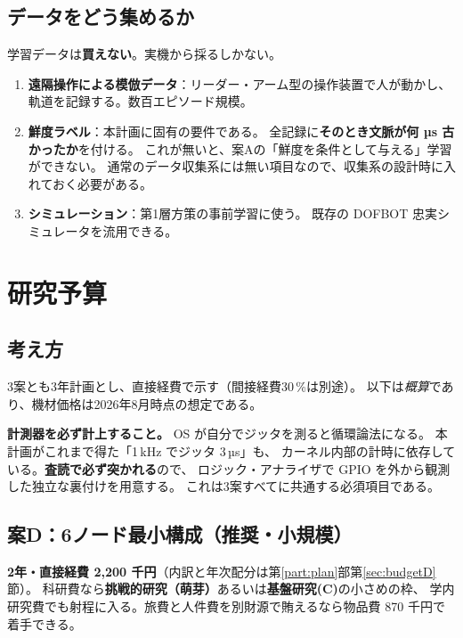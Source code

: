 \documentclass[11pt,a4paper]{article}
\newcommand{\prob}[1]{\textbf{\textcolor{red!55!black}{#1}}}
\newcommand{\keyp}[1]{\textbf{\textcolor{blue!45!black}{#1}}}
\begin{document}
\subsection{データをどう集めるか}

学習データは\prob{買えない}。実機から採るしかない。

\begin{enumerate}[leftmargin=1.6em,itemsep=2pt]
  \item \textbf{遠隔操作による模倣データ}：リーダー・アーム型の操作装置で人が動かし、
        軌道を記録する。数百エピソード規模。
  \item \textbf{鮮度ラベル}：本計画に固有の要件である。
        全記録に\keyp{そのとき文脈が何 µs 古かったか}を付ける。
        これが無いと、案Aの「鮮度を条件として与える」学習ができない。
        通常のデータ収集系には無い項目なので、収集系の設計時に入れておく必要がある。
  \item \textbf{シミュレーション}：第1層方策の事前学習に使う。
        既存の DOFBOT 忠実シミュレータを流用できる。
\end{enumerate}

\section{研究予算}

\subsection{考え方}

3案とも3年計画とし、直接経費で示す（間接経費30\,\%は別途）。
以下は\emph{概算}であり、機材価格は2026年8月時点の想定である。

\medskip
\noindent
\keyp{計測器を必ず計上すること。}
OS が自分でジッタを測ると循環論法になる。
本計画がこれまで得た「1\,kHz でジッタ 3\,µs」も、
カーネル内部の計時に依存している。\prob{査読で必ず突かれる}ので、
ロジック・アナライザで GPIO を外から観測した独立な裏付けを用意する。
これは3案すべてに共通する必須項目である。

\subsection{案D：6ノード最小構成（推奨・小規模）}

\keyp{2年・直接経費 2,200 千円}（内訳と年次配分は第\ref{part:plan}部第\ref{sec:budgetD}節）。
科研費なら\keyp{挑戦的研究（萌芽）}あるいは\keyp{基盤研究(C)}の小さめの枠、
学内研究費でも射程に入る。旅費と人件費を別財源で賄えるなら物品費 870 千円で着手できる。
\end{document}
